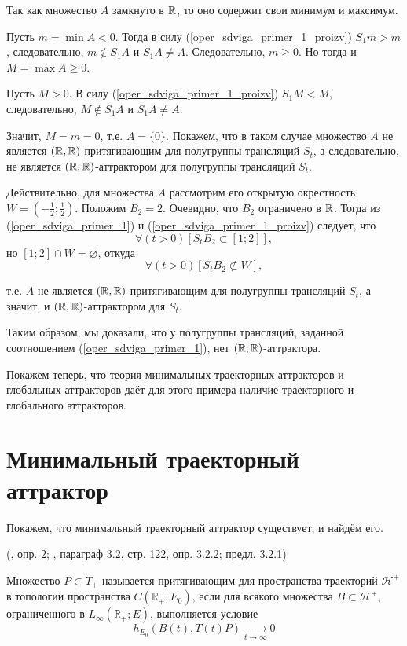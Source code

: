 Так как множество $A$ замкнуто в $\mathbb{R}$, то оно содержит свои минимум и максимум.

Пусть $m = \min A < 0$.
Тогда в силу (\ref{oper_sdviga_primer_1_proizv}) $S_1 m > m$, следовательно, $m \notin S_1 A$ и $S_1 A \neq A$.
Следовательно, $m \geq 0$.
Но тогда и $M = \max A \geq 0$.

Пусть $M > 0$.
В силу (\ref{oper_sdviga_primer_1_proizv}) $S_1 M < M$, следовательно, $M \notin S_1 A$ и $S_1 A \neq A$.

Значит, $M=m=0$, т.е. $A=\{0\}$.
Покажем, что в таком случае множество $A$ не является $(\mathbb{R},\mathbb{R})$-притягивающим для полугруппы трансляций $S_t$, а следовательно, не является $(\mathbb{R},\mathbb{R})$-аттрактором для полугруппы трансляций $S_t$.

Действительно, для множества $A$ рассмотрим его открытую окрестность $ W = (-\frac12;\frac12)$.
Положим $B_2={2}$.
Очевидно, что $B_2$ ограничено в $\mathbb{R}$.
Тогда из (\ref{oper_sdviga_primer_1}) и (\ref{oper_sdviga_primer_1_proizv}) следует, что
$$
	\forall(t>0)[S_t B_2 \subset [1; 2]],
$$
но $[1;2]\cap W = \varnothing$, откуда
$$
	\forall(t>0)[S_t B_2 \not\subset W],
$$

т.е. $A$ не является $(\mathbb{R},\mathbb{R})$-притягивающим для полугруппы трансляций $S_t$,
а значит, и $(\mathbb{R},\mathbb{R})$-аттрактором для $S_t$.

Таким образом, мы доказали, что у полугруппы трансляций, заданной соотношением (\ref{oper_sdviga_primer_1}),
нет $(\mathbb{R},\mathbb{R})$-аттрактора.

Покажем теперь, что теория минимальных траекторных аттракторов и глобальных аттракторов
даёт для этого примера наличие траекторного и глобального аттракторов.


\section{Минимальный траекторный аттрактор}

Покажем, что минимальный траекторный аттрактор существует, и найдём его.

\opred (\cite{zhidkosti_s_pamyatyu}, опр. 2; \cite{Zelenaya}, параграф 3.2, стр. 122, опр. 3.2.2; предл. 3.2.1)

Множество $P \subset T_+$ называется притягивающим для пространства траекторий $\mathcal{H}^+$ в топологии пространства $C(\mathbb{R}_+; E_0)$,
если для всякого множества $B \subset \mathcal{H}^+$, ограниченного в $L_{\infty}(\mathbb{R}_+;E)$, выполняется условие
\begin{equation}
	h_{E_0}(B(t),T(t)P) \xrightarrow[t\to\infty]{}0
\end{equation}

